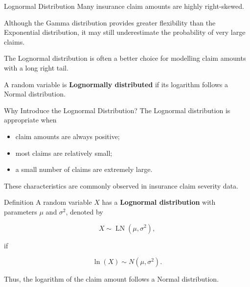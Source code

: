 \documentclass[
  ignorenonframetext,
  aspectratio=169,
]{beamer}
\providecommand{\tightlist}{%
  \setlength{\itemsep}{0pt}\setlength{\parskip}{0pt}}
\begin{document}
\begin{frame}{Lognormal Distribution}
\protect{}\label{lognormal-distribution}
Many insurance claim amounts are highly right-skewed.

Although the Gamma distribution provides greater flexibility than the
Exponential distribution, it may still underestimate the probability of
very large claims.

The Lognormal distribution is often a better choice for modelling claim
amounts with a long right tail.

\begin{tcolorbox}[enhanced jigsaw, arc=.35mm, bottomrule=.15mm, bottomtitle=1mm, breakable, colback=white, colbacktitle=quarto-callout-note-color!10!white, colframe=quarto-callout-note-color-frame, coltitle=black, left=2mm, leftrule=.75mm, opacityback=0, opacitybacktitle=0.6, rightrule=.15mm, title=\textcolor{quarto-callout-note-color}{\faInfo}\hspace{0.5em}{Key Idea}, titlerule=0mm, toprule=.15mm, toptitle=1mm]

A random variable is \textbf{Lognormally distributed} if its logarithm
follows a Normal distribution.

\end{tcolorbox}
\end{frame}

\begin{frame}{Why Introduce the Lognormal Distribution?}
\protect{}\label{why-introduce-the-lognormal-distribution}
The Lognormal distribution is appropriate when

\begin{itemize}
\tightlist
\item
  claim amounts are always positive;
\item
  most claims are relatively small;
\item
  a small number of claims are extremely large.
\end{itemize}

These characteristics are commonly observed in insurance claim severity
data.
\end{frame}

\begin{frame}{Definition}
\protect{}\label{definition-1}
A random variable \(X\) has a \textbf{Lognormal distribution} with
parameters \(\mu\) and \(\sigma^2\), denoted by

\[
X \sim \operatorname{LN}(\mu,\sigma^2),
\]

if

\[
\ln(X)\sim N(\mu,\sigma^2).
\]

Thus, the logarithm of the claim amount follows a Normal distribution.
\end{frame}
\end{document}
